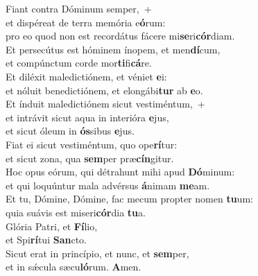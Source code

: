 \evenverse Fiant contra Dóminum semper,~+\\\evenverse  et dispéreat de terra memória e\textbf{ó}rum:~\*\\
\evenverse pro eo quod non est recordátus fácere mi\textbf{se}ri\textbf{cór}diam.\\
\oddverse Et persecútus est hóminem ínopem, et men\textbf{dí}cum,~\*\\
\oddverse et compúnctum corde mor\textbf{ti}fi\textbf{cá}re.\\
\evenverse Et diléxit maledictiónem, et véniet \textbf{e}i:~\*\\
\evenverse et nóluit benedictiónem, et elongábi\textbf{tur} ab \textbf{e}o.\\
\oddverse Et índuit maledictiónem sicut vestiméntum,~+\\
\oddverse  et intrávit sicut aqua in interióra \textbf{e}jus,~\*\\
\oddverse et sicut óleum in \textbf{ós}sibus \textbf{e}jus.\\
\evenverse Fiat ei sicut vestiméntum, quo ope\textbf{rí}tur:~\*\\
\evenverse et sicut zona, qua \textbf{sem}per præ\textbf{cín}gitur.\\
\oddverse Hoc opus eórum, qui détrahunt mihi apud \textbf{Dó}minum:~\*\\
\oddverse et qui loquúntur mala advérsus \textbf{á}nimam \textbf{me}am.\\
\evenverse Et tu, Dómine, Dómine, fac mecum propter nomen \textbf{tu}um:~\*\\
\evenverse quia suávis est miseri\textbf{cór}dia \textbf{tu}a.\\
\oddverse Glória Patri, et \textbf{Fí}lio,~\*\\
\oddverse et Spi\textbf{rí}tui \textbf{San}cto.\\
\evenverse Sicut erat in princípio, et nunc, et \textbf{sem}per,~\*\\
\evenverse et in sǽcula sæcu\textbf{ló}rum. \textbf{A}men.\\
